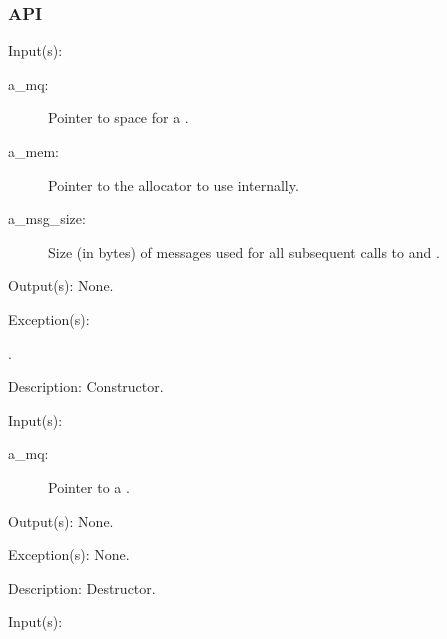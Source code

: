 \subsubsection{API}
\begin{capi}
\label{mq_new}
	\begin{capilist}
	\item[Input(s): ]
		\begin{description}\item[]
		\item[a\_mq: ]
			Pointer to space for a .
		\item[a\_mem: ]
			Pointer to the allocator to use internally.
		\item[a\_msg\_size: ]
			Size (in bytes) of messages used for all subsequent
			calls to  and .
		\end{description}
	\item[Output(s): ] None.
	\item[Exception(s): ]
		\begin{description}\item[]
		\item[.]
		\end{description}
	\item[Description: ]
		Constructor.
	\end{capilist}
\label{mq_delete}
	\begin{capilist}
	\item[Input(s): ]
		\begin{description}\item[]
		\item[a\_mq: ]
			Pointer to a \classname{mq}.
		\end{description}
	\item[Output(s): ] None.
	\item[Exception(s): ] None.
	\item[Description: ]
		Destructor.
	\end{capilist}
\label{mq_tryget}
	\begin{capilist}
	\item[Input(s): ]
		\begin{description}\item[]

\end{description}
\end{capilist}
\end{capi}
